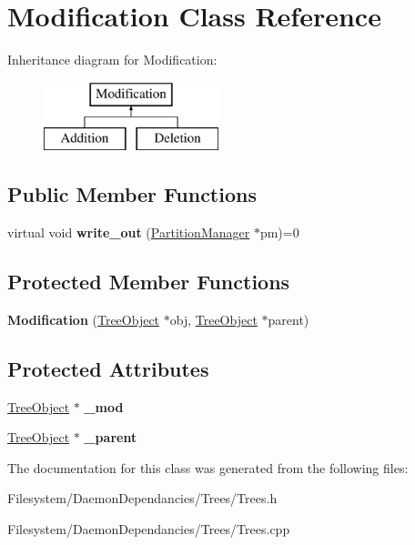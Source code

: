 \hypertarget{classModification}{}\section{Modification Class Reference}
\label{classModification}
Inheritance diagram for Modification\+:\begin{figure}[H]
\begin{center}
\leavevmode
\includegraphics[height=2.000000cm]{d1/de6/classModification}
\end{center}
\end{figure}
\subsection*{Public Member Functions}
\begin{DoxyCompactItemize}
\item 
\mbox{\label{classModification_a50d1fd809524902d2a1e78d02f4be1dc}} 
virtual void {\bfseries write\+\_\+out} (\mbox{\hyperlink{classPartitionManager}{Partition\+Manager}} $\ast$pm)=0
\end{DoxyCompactItemize}
\subsection*{Protected Member Functions}
\begin{DoxyCompactItemize}
\item 
\mbox{\label{classModification_a76407b8c6d2adb840dceea708355aba8}} 
{\bfseries Modification} (\mbox{\hyperlink{classTreeObject}{Tree\+Object}} $\ast$obj, \mbox{\hyperlink{classTreeObject}{Tree\+Object}} $\ast$parent)
\end{DoxyCompactItemize}
\subsection*{Protected Attributes}
\begin{DoxyCompactItemize}
\item 
\mbox{\label{classModification_a0aa2f9924cde904b1683f3bd80d87a02}} 
\mbox{\hyperlink{classTreeObject}{Tree\+Object}} $\ast$ {\bfseries \+\_\+mod}
\item 
\mbox{\label{classModification_a529d02be9866b96746bcae63a763f868}} 
\mbox{\hyperlink{classTreeObject}{Tree\+Object}} $\ast$ {\bfseries \+\_\+parent}
\end{DoxyCompactItemize}


The documentation for this class was generated from the following files\+:\begin{DoxyCompactItemize}
\item 
Filesystem/\+Daemon\+Dependancies/\+Trees/Trees.\+h\item 
Filesystem/\+Daemon\+Dependancies/\+Trees/Trees.\+cpp\end{DoxyCompactItemize}
